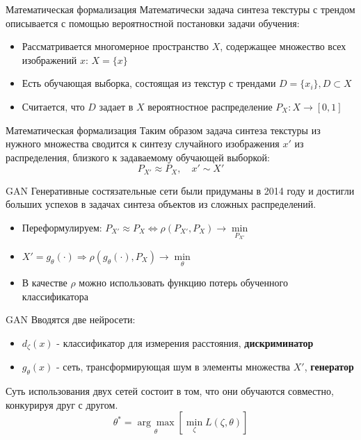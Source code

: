 \documentclass[12pt]{beamer}
\begin{document}
	\begin{frame}{Математическая формализация}
		Математически задача синтеза текстуры с трендом описывается с помощью вероятностной постановки задачи обучения:
		\begin{itemize}
			\item Рассматривается многомерное пространство $X$, содержащее множество всех изображений $x$: $X = \{x\}$
			\item Есть обучающая выборка, состоящая из текстур с трендами $D = \{x_i\}, D \subset X$
			\item Считается, что  $D$ задает в $X$ вероятностное распределение $P_X : X \longrightarrow [0,1]$
		\end{itemize}
	\end{frame}
	
	\begin{frame}{Математическая формализация}
		Таким образом задача синтеза текстуры из нужного множества сводится к синтезу случайного изображения $x'$ из распределения, близкого к задаваемому обучающей выборкой:
		$$ P_{X'} \approx P_X, \quad x' \sim X'$$
	\end{frame}
	
	\begin{frame}{GAN}
		Генеративные состязательные сети были придуманы в 2014 году и достигли больших успехов в задачах синтеза объектов из сложных распределений.
		\begin{itemize}
			\item Переформулируем: $ P_{X'} \approx P_X \Leftrightarrow \rho(P_{X'}, P_X) \longrightarrow \underset{P_{X'}}{\min} $
			\item $ X' = g_{\theta}(\cdot) \Rightarrow \rho(g_{\theta}(\cdot), P_X) \longrightarrow \underset{\theta}{\min}$
			\item В качестве $\rho$ можно использовать функцию потерь обученного классификатора
		\end{itemize}
	\end{frame}
	
	\begin{frame}{GAN}
		Вводятся две нейросети:
		\begin{itemize}
			\item $d_{\zeta}(x)$ - классификатор для измерения расстояния, \textbf{дискриминатор}
			\item $g_{\theta}(x)$ - сеть, трансформирующая шум в элементы множества $X'$, \textbf{генератор}
		\end{itemize}
		Суть использования двух сетей состоит в том, что они обучаются совместно, конкурируя друг с другом.
		$$ \theta^* = \underset{\theta}{\arg\max} \left[ \underset{\zeta}{\min} L(\zeta, \theta) \right] $$
	\end{frame}
	
\end{document}
